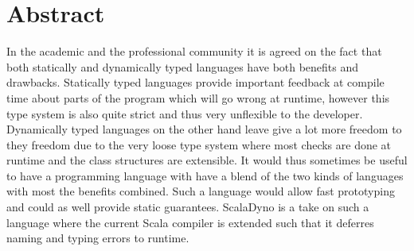 \section{Abstract}

In the academic and the professional community it is agreed on the fact that
both statically and dynamically typed languages have both benefits and
drawbacks. Statically typed languages provide important feedback at compile time
about parts of the program which will go wrong at runtime, however this type
system is also quite strict and thus very unflexible to the developer.
Dynamically typed languages on the other hand leave give a lot more freedom to
they freedom due to the very loose type system where most checks are done at
runtime and the class structures are extensible. It would thus sometimes be
useful to have a programming language with have a blend of the two kinds of
languages with most the benefits combined. Such a language would allow fast
prototyping and could as well provide static guarantees.
ScalaDyno is a take on such a language where the current Scala compiler is
extended such that it deferres naming and typing errors to runtime.